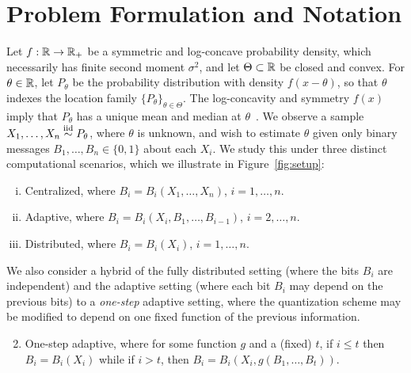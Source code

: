 
\section{Problem Formulation and Notation}
\label{sec:problem}

Let $f : \mathbb{R} \to \mathbb{R}_+$ be a symmetric and log-concave probability density,
which necessarily has finite second moment $\sigma^2$, and let $\Theta
\subset \mathbb{R}$ be closed and convex.  For $\theta \in \mathbb{R}$, let $P_\theta$ be
the probability distribution with density $f(x-\theta)$, so that $\theta$
indexes the location family $\{P_\theta\}_{\theta \in \Theta}$.  The
log-concavity and symmetry $f(x)$ imply that $P_\theta$ has a unique mean
and median at $\theta$~\cite{ibragimov1956composition}.
We observe a sample $X_1, \ldots, X_n \stackrel{\textup{iid}}{\sim} P_\theta$, where $\theta$
is unknown, and wish to estimate $\theta$ given only binary
messages $B_1, \ldots, B_n \in \{0, 1\}$ about each $X_i$.
We study this under three distinct computational scenarios, which
we illustrate in Figure~\ref{fig:setup}:
\begin{enumerate}[(i)]
\item \label{item:centralized} Centralized, where $B_i =
  B_i(X_1,\ldots,X_n)$, $i=1,\ldots,n$.
\item \label{item:adaptive} Adaptive, where $B_i =
  B_i(X_i,B_1,\ldots,B_{i-1})$, $i=2,\ldots,n$.
\item \label{item:distributed}
  Distributed, where $B_i = B_i(X_i)$, $i=1,\ldots,n$.
\end{enumerate}
\noindent
We also consider a hybrid of the fully distributed setting (where the bits
$B_i$ are independent) and the adaptive setting (where each bit $B_i$ may
depend on the previous bits) to a \emph{one-step} adaptive setting, where
the quantization scheme may be modified to depend on one fixed function of
the previous information.
\begin{enumerate}[(i')]
\setcounter{enumi}{1}
\item One-step adaptive, where for some function $g$ and
  a (fixed) $t$, if $i \le t$ then
  $B_i = B_i(X_i)$ while if $i > t$, then
  $B_i = B_i(X_i, g(B_1, \ldots, B_t))$.
\end{enumerate}

